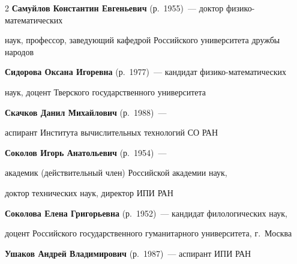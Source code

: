 \begin{multicols}{2}
\textbf{Самуйлов Константин Евгеньевич} (р.\ 1955)~--- доктор фи\-зи\-ко-ма\-те\-ма\-ти\-че\-ских 

наук, профессор, за\-ве\-ду\-ющий кафедрой Российского университета дружбы народов



\vspace*{4pt}



\noindent

\textbf{Сидорова Оксана Игоревна} (р.\ 1977)~--- кан\-ди\-дат фи\-зи\-ко-ма\-те\-ма\-ти\-че\-ских 

наук, доцент Тверского государственного университета



\pagebreak








\noindent

\textbf{Скачков Данил Михайлович} (р.\ 1988)~--- 

аспирант Института вычислительных технологий СО РАН






\vspace*{5pt}



\noindent 

\textbf{Соколов Игорь Анатольевич} (р.\ 1954)~---

академик (действительный член) Российской академии наук,

доктор технических наук, директор ИПИ РАН



\vspace*{3pt}



\noindent

\textbf{Соколова Елена Григорьевна} (р.\ 1952)~--- кандидат филологических наук, 

доцент Российского государственного гуманитарного университета, г.~Москва



\vspace*{3pt}



\noindent

\textbf{Ушаков Андрей Владимирович} (р.\ 1987)~--- аспирант ИПИ РАН




\end{multicols}
